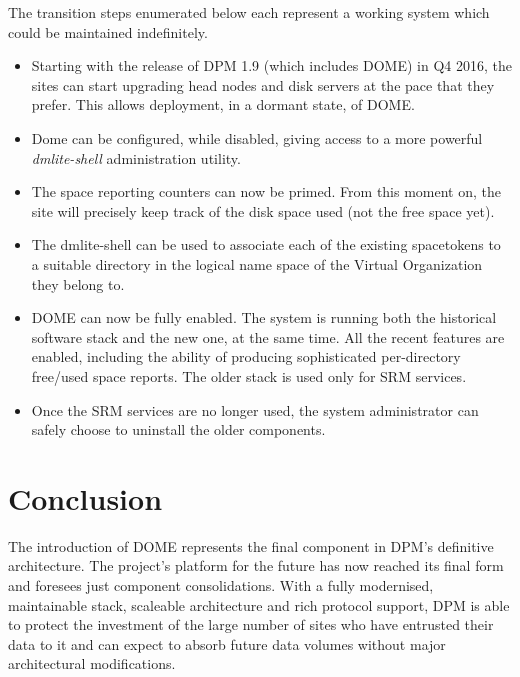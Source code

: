\documentclass[a4paper]{jpconf}
\begin{document}
The transition steps enumerated below each represent a working system which could be maintained indefinitely.

\begin{itemize}
 \item Starting with the release of DPM 1.9 (which includes DOME) in Q4 2016, the sites can start upgrading
head nodes and disk servers at the pace that they prefer. This allows deployment, in a dormant state, of DOME. 
 \item Dome can be configured, while disabled, giving access to a more powerful \textit{dmlite-shell} administration utility.
 \item The space reporting counters can now be primed. From this moment on, the site will precisely keep track of the disk space used (not the free space yet).
 \item The dmlite-shell can be used to associate each of the existing spacetokens to a suitable directory
in the logical name space of the Virtual Organization they belong to.
 \item DOME can now be fully enabled.  The system is running both the historical software stack and the new one, at the same time.  All the recent features are enabled, including the ability of producing sophisticated per-directory free/used space reports. The older stack is used only for SRM services. 
 \item Once the SRM services are no longer used, the system administrator can safely choose to uninstall the older components.

\end{itemize}


\section{Conclusion}

The introduction of DOME represents the final component in DPM's definitive architecture. The project's
platform for the future has now reached its final form and foresees just component consolidations.
With a fully modernised, maintainable stack, scaleable architecture
and rich protocol support, DPM is able to protect the investment of the large number of sites who have
entrusted their data to it and can expect to absorb future data volumes without major architectural modifications.
\end{document}
